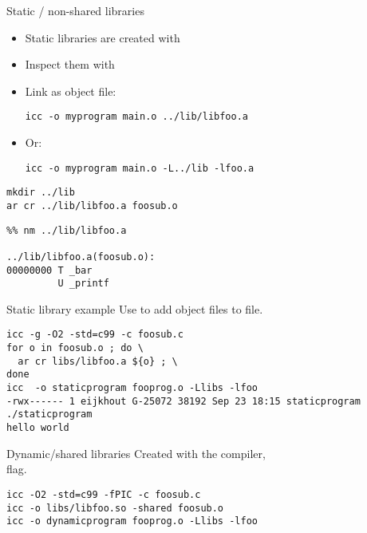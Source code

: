 \documentclass[11pt,headernav]{beamer}
\begin{document}
\begin{numberedframe}{Static / non-shared libraries}
  \label{sl-tut:libar}
  \begin{itemize}
  \item Static libraries are created with 
  \item Inspect them with 
  \item Link as object file:
\begin{verbatim}
icc -o myprogram main.o ../lib/libfoo.a
\end{verbatim}
\item Or:
\begin{verbatim}
icc -o myprogram main.o -L../lib -lfoo.a
\end{verbatim}
  \end{itemize}
  \begin{multicols}{2}
    \small
\begin{verbatim}
mkdir ../lib
ar cr ../lib/libfoo.a foosub.o
\end{verbatim}
\columnbreak
\begin{verbatim}
%% nm ../lib/libfoo.a 

../lib/libfoo.a(foosub.o):
00000000 T _bar
         U _printf
\end{verbatim}
  \end{multicols}
\end{numberedframe}

\begin{numberedframe}{Static library example}
  \label{sl-tut:liba}
 Use  to add object files to  file.

\footnotesize
\begin{verbatim}
icc -g -O2 -std=c99 -c foosub.c
for o in foosub.o ; do \
  ar cr libs/libfoo.a ${o} ; \
done
icc  -o staticprogram fooprog.o -Llibs -lfoo
-rwx------ 1 eijkhout G-25072 38192 Sep 23 18:15 staticprogram
./staticprogram
hello world
\end{verbatim}
\end{numberedframe}

\begin{numberedframe}{Dynamic/shared libraries}
  \label{sl-tut:libso.1}
  Created with the compiler,\\
   flag.
\begin{verbatim}
icc -O2 -std=c99 -fPIC -c foosub.c
icc -o libs/libfoo.so -shared foosub.o
icc -o dynamicprogram fooprog.o -Llibs -lfoo
\end{verbatim}
\end{numberedframe}
\end{document}
